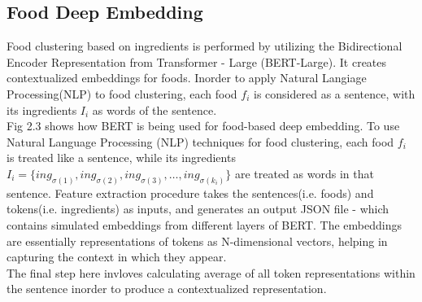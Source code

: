 \subsection{Food Deep Embedding}
Food clustering based on ingredients is performed by utilizing the Bidirectional Encoder Representation from Transformer - Large (BERT-Large)\cite*{devlin2019bert}. It creates contextualized embeddings for foods. Inorder to apply Natural Langiage Processing(NLP) to food clustering, each food $f_i$ is considered as a sentence, with its ingredients $I_i$ as words\cite*{9775081, oulu_tdlgc} of the sentence.
\\
\indent Fig 2.3\cite*{9775081, oulu_tdlgc} shows how BERT is being used for food-based deep embedding\cite*{9775081}. To use Natural Language Processing (NLP) techniques for food clustering, each food $f_i$ is treated like a sentence, while its ingredients $I_i=\{ing_{\sigma(1)},ing_{\sigma(2)},ing_{\sigma(3)},\ldots,ing_{\sigma(k_i)}\}$ are treated as words in that sentence\cite*{9775081, oulu_tdlgc}. Feature extraction procedure takes the sentences(i.e. foods) and tokens(i.e. ingredients) as inputs, and generates an output JSON file - which contains simulated embeddings from different layers of BERT\cite*{9775081,devlin2019bert}. The embeddings are essentially representations of tokens as N-dimensional vectors, helping in capturing the context in which they appear.
\\
\indent The final step here invloves calculating average of all token representations within the sentence inorder to produce a contextualized representation\cite*{9775081, oulu_tdlgc}.
